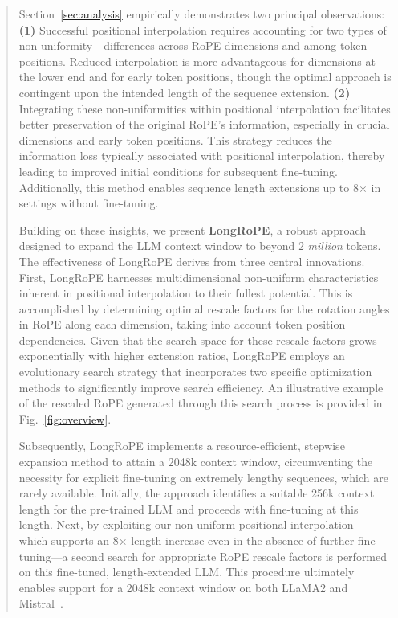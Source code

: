 \begin{abstract}
Section~\ref{sec:analysis} empirically demonstrates two principal observations: \textbf{(1)} Successful positional interpolation requires accounting for two types of non-uniformity—differences across RoPE dimensions and among token positions. Reduced interpolation is more advantageous for dimensions at the lower end and for early token positions, though the optimal approach is contingent upon the intended length of the sequence extension. \textbf{(2)} Integrating these non-uniformities within positional interpolation facilitates better preservation of the original RoPE's information, especially in crucial dimensions and early token positions. This strategy reduces the information loss typically associated with positional interpolation, thereby leading to improved initial conditions for subsequent fine-tuning. Additionally, this method enables sequence length extensions up to 8$\times$ in settings without fine-tuning.

Building on these insights, we present \textbf{LongRoPE}, a robust approach designed to expand the LLM context window to beyond 2 \emph{million} tokens. The effectiveness of LongRoPE derives from three central innovations. First, {LongRoPE} harnesses multidimensional non-uniform characteristics inherent in positional interpolation to their fullest potential. This is accomplished by determining optimal rescale factors for the rotation angles in RoPE along each dimension, taking into account token position dependencies. Given that the search space for these rescale factors grows exponentially with higher extension ratios, {LongRoPE} employs an evolutionary search strategy that incorporates two specific optimization methods to significantly improve search efficiency. An illustrative example of the rescaled RoPE generated through this search process is provided in Fig.~\ref{fig:overview}.

Subsequently, {LongRoPE} implements a resource-efficient, stepwise expansion method to attain a 2048k context window, circumventing the necessity for explicit fine-tuning on extremely lengthy sequences, which are rarely available. Initially, the approach identifies a suitable 256k context length for the pre-trained LLM and proceeds with fine-tuning at this length. Next, by exploiting our non-uniform positional interpolation—which supports an 8$\times$ length increase even in the absence of further fine-tuning—a second search for appropriate RoPE rescale factors is performed on this fine-tuned, length-extended LLM. This procedure ultimately enables support for a 2048k context window on both LLaMA2 and Mistral~\cite{mistral}.


\end{abstract}
